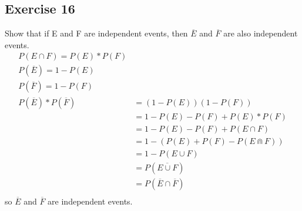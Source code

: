 \documentclass[12pt]{article}
\begin{document}
\subsection*{Exercise 16}
Show that if E and F are independent events, then $\overline{E}$ and $\overline{F}$ are also independent events.\\
\begin{equation}\nonumber
    \begin{split}
        P(E\cap F)=P(E)*P(F)\\
        P(\overline{E})=1-P(E)\\
        P(\overline{F})=1-P(F)\\
        P(\overline{E})*P(\overline{F})&=(1-P(E))(1-P(F))\\
        &=1-P(E)-P(F)+P(E)*P(F)\\
        &=1-P(E)-P(F)+P(E\cap F)\\
        &=1-(P(E)+P(F)-P(E\Cap F))\\
        &=1-P(E\cup F)\\
        &=P(\overline{E\cup F})\\
        &=P(\overline{E}\cap\overline{F})\\
    \end{split}
\end{equation}
so $\overline{E}$ and $\overline{F}$ are independent events.\\
\\
\end{document}
